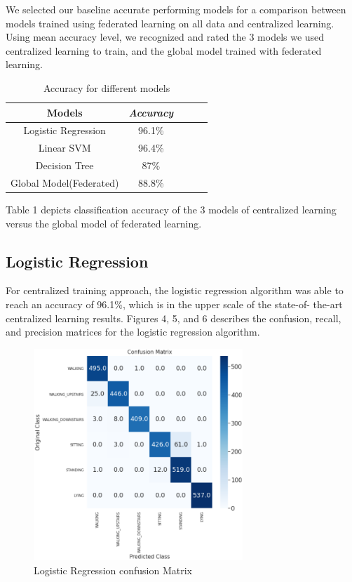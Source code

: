 \documentclass[12pt,conference]{IEEEtran}
\begin{document}
We selected our baseline accurate performing models for a comparison between models trained using federated learning on all data and centralized learning. Using mean accuracy level, we recognized and rated the 3 models we used centralized learning to train, and the global model trained with federated learning.

\begin{table}[!t]
\caption{Accuracy for different models}
\begin{center}
\begin{tabular}{c|cccc}
\toprule %
\textbf{Models} & \textbf{\textit{Accuracy}} \\
\midrule %
Logistic Regression& 96.1\% \\
Linear SVM& 96.4\% \\
Decision Tree& 87\% \\
Global Model(Federated)& 88.8\% \\
\bottomrule %
\end{tabular}
\label{tab1}
\end{center}
\vspace{-0.1in}
\end{table}

Table 1 depicts classification accuracy of the 3 models of centralized learning versus the global model of federated learning.

\subsection{Logistic Regression}

For centralized training approach, the logistic regression algorithm was able to reach an accuracy of 96.1\%, which is in the upper scale of the state-of-
the-art centralized learning results. Figures 4, 5, and 6 describes the confusion, recall, and precision matrices for the logistic regression algorithm.

\begin{figure} [!t]
	\centering
	\includegraphics[width=3.1in]{Logistic_cm.PNG}
	\caption{Logistic Regression confusion Matrix}
	\label{}
\end{figure}
\end{document}

